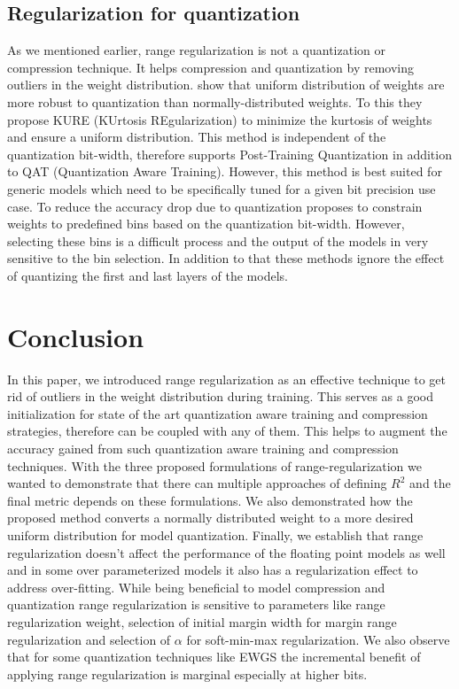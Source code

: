 \documentclass[10pt,twocolumn,letterpaper]{article}
\begin{document}
\subsection{Regularization for quantization}
As we mentioned earlier, range regularization is not a quantization or compression technique. It helps compression and quantization by removing outliers in the weight distribution. \cite{kure} show that uniform distribution of weights are more robust to quantization than normally-distributed weights. To this they propose KURE (KUrtosis REgularization) to minimize the kurtosis of weights and ensure a uniform distribution. This method is independent of the quantization bit-width, therefore supports Post-Training Quantization in addition to QAT (Quantization Aware Training). However, this method is best suited for generic models which need to be specifically tuned for a given bit precision use case. To reduce the accuracy drop due to quantization \cite{binregularization} proposes to constrain weights to predefined bins based on the quantization bit-width. However, selecting these bins is a difficult process and the output of the models in very sensitive to the bin selection. In addition to that these methods ignore the effect of quantizing the first and last layers of the models. \section{Conclusion}
In this paper, we introduced range regularization as an effective technique to get rid of outliers in the weight distribution during training. This serves as a good initialization for state of the art quantization aware training and compression strategies, therefore can be coupled with any of them. This helps to augment the accuracy gained from such quantization aware training and compression techniques. With the three proposed formulations of range-regularization we wanted to demonstrate that there can multiple approaches of defining $R^2$ and the final metric depends on these formulations. We also demonstrated how the proposed method converts a normally distributed weight to a more desired uniform distribution for model quantization. Finally, we establish that range regularization doesn't affect the performance of the floating point models as well and in some over parameterized models it also has a regularization effect to address over-fitting. While being beneficial to model compression and quantization range regularization is sensitive to parameters like range regularization weight, selection of initial margin width for margin range regularization and selection of $\alpha$ for soft-min-max regularization. We also observe that for some quantization techniques like EWGS the incremental benefit of applying range regularization is marginal especially at higher bits. {\small


}
\end{document}
